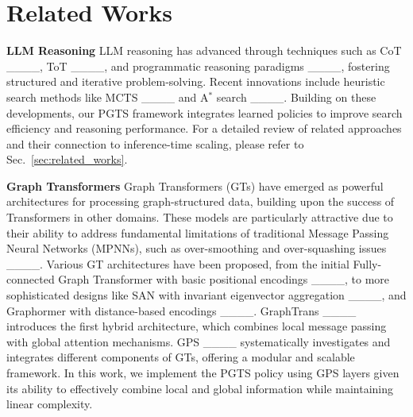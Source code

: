 \section{Related Works}
\textbf{LLM Reasoning}\quad
LLM reasoning has advanced through techniques such as CoT ____, ToT ____, and programmatic reasoning paradigms ____, fostering structured and iterative problem-solving. Recent innovations include heuristic search methods like MCTS ____ and A$^*$ search ____. Building on these developments, our PGTS framework integrates learned policies to improve search efficiency and reasoning performance. For a detailed review of related approaches and their connection to inference-time scaling, please refer to Sec.~\ref{sec:related_works}.

\textbf{Graph Transformers}\quad
Graph Transformers (GTs) have emerged as powerful architectures for processing graph-structured data, building upon the success of Transformers in other domains. These models are particularly attractive due to their ability to address fundamental limitations of traditional Message Passing Neural Networks (MPNNs), such as over-smoothing and over-squashing issues ____. Various GT architectures have been proposed, from the initial Fully-connected Graph Transformer with basic positional encodings ____, to more sophisticated designs like SAN with invariant eigenvector aggregation ____, and Graphormer with distance-based encodings ____. GraphTrans ____ introduces the first hybrid architecture, which combines local message passing with global attention mechanisms. GPS ____ systematically investigates and integrates different components of GTs, offering a modular and scalable framework. In this work, we implement the PGTS policy using GPS layers given its ability to effectively combine local and global information while maintaining linear complexity.

